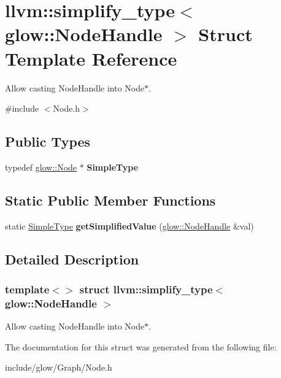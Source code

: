\hypertarget{structllvm_1_1simplify__type_3_01glow_1_1_node_handle_01_4}{}\section{llvm\+:\+:simplify\+\_\+type$<$ glow\+:\+:Node\+Handle $>$ Struct Template Reference}
\label{structllvm_1_1simplify__type_3_01glow_1_1_node_handle_01_4}


Allow casting Node\+Handle into Node$\ast$.  




{\ttfamily \#include $<$Node.\+h$>$}

\subsection*{Public Types}
\begin{DoxyCompactItemize}
\item 
\mbox{\label{structllvm_1_1simplify__type_3_01glow_1_1_node_handle_01_4_a0d92a2e2f0daed98d559039de7027e15}} 
typedef \hyperlink{classglow_1_1_node}{glow\+::\+Node} $\ast$ {\bfseries Simple\+Type}
\end{DoxyCompactItemize}
\subsection*{Static Public Member Functions}
\begin{DoxyCompactItemize}
\item 
\mbox{\label{structllvm_1_1simplify__type_3_01glow_1_1_node_handle_01_4_a4673d79676037fed832a0fa590690ac4}} 
static \hyperlink{classglow_1_1_node}{Simple\+Type} {\bfseries get\+Simplified\+Value} (\hyperlink{structglow_1_1_node_handle}{glow\+::\+Node\+Handle} \&val)
\end{DoxyCompactItemize}


\subsection{Detailed Description}
\subsubsection*{template$<$$>$\newline
struct llvm\+::simplify\+\_\+type$<$ glow\+::\+Node\+Handle $>$}

Allow casting Node\+Handle into Node$\ast$. 

The documentation for this struct was generated from the following file\+:\begin{DoxyCompactItemize}
\item 
include/glow/\+Graph/Node.\+h\end{DoxyCompactItemize}
